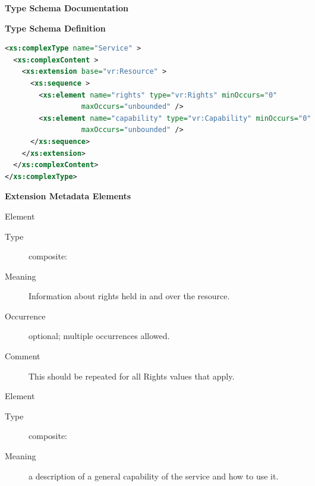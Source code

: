 \documentclass[11pt,a4paper]{ivoa}
\begin{document}
\begin{generated}
\begingroup
      	\renewcommand*\descriptionlabel[1]{%
      	\hbox to 5.5em{\emph{#1}\hfil}}\vspace{2ex}\noindent\textbf{ Type Schema Documentation}


\vspace{1ex}\noindent\textbf{ Type Schema Definition}

\begin{lstlisting}[language=XML,basicstyle=\footnotesize]
<xs:complexType name="Service" >
  <xs:complexContent >
    <xs:extension base="vr:Resource" >
      <xs:sequence >
        <xs:element name="rights" type="vr:Rights" minOccurs="0"
                  maxOccurs="unbounded" />
        <xs:element name="capability" type="vr:Capability" minOccurs="0"
                  maxOccurs="unbounded" />
      </xs:sequence>
    </xs:extension>
  </xs:complexContent>
</xs:complexType>
\end{lstlisting}

\vspace{0.5ex}\noindent\textbf{ Extension Metadata Elements}

\begingroup\small\begin{bigdescription}\item[Element \xmlel{rights}]
\begin{description}
\item[Type] composite: 
\item[Meaning] 
                       Information about rights held in and over the resource.
                     
\item[Occurrence] optional; multiple occurrences allowed.
\item[Comment] 
                       This should be repeated for all Rights values that apply.
                     

\end{description}
\item[Element \xmlel{capability}]
\begin{description}
\item[Type] composite: 
\item[Meaning] 
                        a description of a general capability of the
                        service and how to use it.
                     

\end{description}
\end{bigdescription}
\end{generated}
\end{document}
